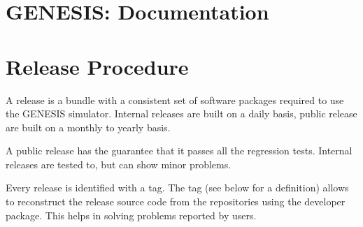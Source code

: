 \documentclass[12pt]{article}
\begin{document}
\section*{GENESIS: Documentation}

\section*{Release Procedure}

A release is a bundle with a consistent set of software packages
required to use the GENESIS simulator.  Internal releases are built on
a daily basis, public release are built on a monthly to yearly basis.

A public release has the guarantee that it passes all the regression
tests.  Internal releases are tested to, but can show minor problems.

Every release is identified with a tag.  The tag (see below for a
definition) allows to reconstruct the release source code from the
repositories using the developer package.  This helps in solving
problems reported by users.
\end{document}
